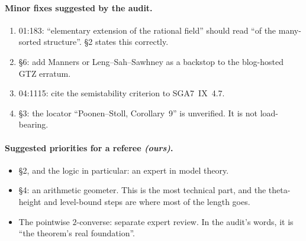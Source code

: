 \documentclass[11pt]{article}
\theoremstyle{definition}
\newcommand{\src}[1]{\textsf{#1}}
\begin{document}
\paragraph{Minor fixes suggested by the audit.}
\begin{enumerate}
\item \src{01:183}: ``elementary extension of the rational field'' should
read ``of the many-sorted structure''.  \S2 states this correctly.
\item \S6: add Manners or Leng--Sah--Sawhney as a backstop to the
blog-hosted GTZ erratum.
\item \src{04:1115}: cite the semistability criterion to SGA7~IX~4.7.
\item \S3: the locator ``Poonen--Stoll, Corollary~9'' is unverified.  It is
not load-bearing.
\end{enumerate}

\paragraph{Suggested priorities for a referee \emph{(ours)}.}
\begin{itemize}
\item \S2, and the logic in particular: an expert in model theory.
\item \S4: an arithmetic geometer.  This is the most technical part, and
the theta-height and level-bound steps are where most of the length goes.
\item The pointwise $2$-converse: separate expert review.  In the audit's
words, it is ``the theorem's real foundation''.
\end{itemize}
\end{document}
